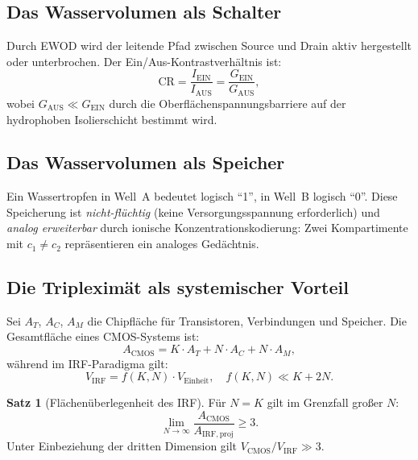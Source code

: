 ﻿\documentclass[a4paper,12pt]{scrreprt}
\theoremstyle{definition}
\newtheorem{satz}{Satz}[section]
\begin{document}
\subsection{Das Wasservolumen als Schalter}

Durch EWOD wird der leitende Pfad zwischen Source und Drain aktiv hergestellt
oder unterbrochen. Der Ein/Aus-Kontrastverhältnis ist:
\begin{equation}
  \mathrm{CR} = \frac{I_{\mathrm{EIN}}}{I_{\mathrm{AUS}}} = \frac{G_{\mathrm{EIN}}}{G_{\mathrm{AUS}}},
\end{equation}
wobei $G_{\mathrm{AUS}} \ll G_{\mathrm{EIN}}$ durch die Oberflächenspannungsbarriere
auf der hydrophoben Isolierschicht bestimmt wird.

\subsection{Das Wasservolumen als Speicher}

Ein Wassertropfen in Well~A bedeutet logisch ``1'', in Well~B logisch ``0''.
Diese Speicherung ist \emph{nicht-flüchtig} (keine Versorgungsspannung
erforderlich) und \emph{analog erweiterbar} durch ionische Konzentrations\-kodierung:
Zwei Kompartimente mit $c_1 \neq c_2$ repräsentieren ein analoges Gedächtnis.

\subsection{Die Tripleximät als systemischer Vorteil}

Sei $A_T$, $A_C$, $A_M$ die Chipfläche für Transistoren, Verbindungen und
Speicher. Die Gesamtfläche eines CMOS-Systems ist:
\begin{equation}
  A_{\mathrm{CMOS}} = K \cdot A_T + N \cdot A_C + N \cdot A_M,
\end{equation}
während im IRF-Paradigma gilt:
\begin{equation}
  V_{\mathrm{IRF}} = f(K, N) \cdot V_{\mathrm{Einheit}}, \quad f(K,N) \ll K + 2N.
\end{equation}

\begin{satz}[Flächenüberlegenheit des IRF]
  Für $N = K$ gilt im Grenzfall großer $N$:
  \begin{equation}
    \lim_{N\to\infty} \frac{A_{\mathrm{CMOS}}}{A_{\mathrm{IRF,proj}}} \geq 3.
  \end{equation}
  Unter Einbeziehung der dritten Dimension gilt $V_{\mathrm{CMOS}}/V_{\mathrm{IRF}} \gg 3$.
\end{satz}
\end{document}
